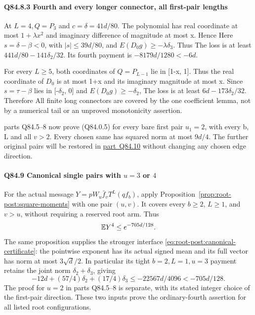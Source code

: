 \paragraph{Q84.8.3 Fourth and every longer connector, all first-pair lengths}

At \(L=4,\allowbreak  Q=P_3\) and \(c=\delta=41d/80\). The polynomial has real coordinate
at most \(1+\lambda x^2\) and imaginary difference of magnitude at
most x. Hence
Here \(s=\delta-\beta<0\), with \(|s|\le39d/80\), and
\(E(D_0g)\ge-\lambda \delta_3\). Thus
The loss is at least \(441d/80-141\delta_2/32\). Its fourth payment is
\(-8179d/1280<-6d\).

For every \(L\ge 5\), both coordinates of \(Q=P_{L-1}\) lie in [1-x, 1]. Thus
the real coordinate of \(D_0\) is at most 1+x and its imaginary magnitude
at most x. Since \(s=\tau-\beta\) lies in [-\(\delta_2\), 0] and
\(E(D_0g)\ge-\delta_2\),
The loss is at least \(6d-173\delta_2/32\). Therefore
All finite long connectors are covered by the one coefficient lemma,
not by a numerical tail or an unproved monotonicity assertion.

parts Q84.5--8 now prove (Q84.0.5) for every bare first pair \(u_1=2\),
with every b, L and all \(v>2\). Every chosen same has squared
norm at most \(9d/4\). The further original pairs will be restored in
\mbox{\hyperref[part:Q84.10]{part Q84.10}} without changing any chosen edge direction.

\paragraph{Q84.9 Canonical single pairs with \(u=3\) or \(4\)}
\label{part:root-post:canonical-fourth}
For the actual message \(Y=pW_u\bar f_vT^L(qf_b)\), apply
Proposition~\ref{prop:root-post:square-moments} with one pair
\((u,v)\). It covers every \(b\ge2\), \(L\ge1\), and \(v>u\), without
requiring a reserved root arm. Thus
\[
 \mathbb E Y^4\le e^{-705d/128}.
\]
The same proposition supplies the stronger interface
\eqref{eq:root-post:canonical-certificate}: the pointwise exponent
has its actual signed mean and its full vector has norm at most
\(3\sqrt d/2\). In particular its tight \(b=2,L=1,u=3\) payment
retains the joint norm \(\delta_2+\delta_3\), giving
\[
 -12d+(57/4)\delta_2+(17/4)\delta_3
 \le-22567d/4096<-705d/128.
\]
The proof for \(u=2\) in parts Q84.5--8 is separate, with its stated
integer choice of the first-pair direction. These two inputs prove
the ordinary-fourth assertion for all listed root configurations.

